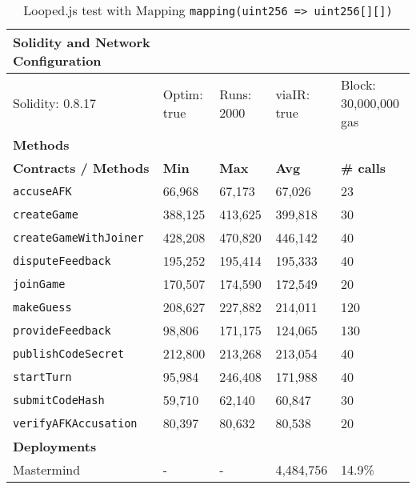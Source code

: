 \begin{table}[ht]
\centering
\begin{tabular}{|l|l|l|l|l|}
\hline
\textbf{Solidity and Network Configuration} & \multicolumn{4}{l|}{} \\ \hline
Solidity: 0.8.17 & Optim: true & Runs: 2000 & viaIR: true & Block: 30,000,000 gas \\ \hline
\textbf{Methods} & \multicolumn{4}{l|}{} \\ \hline
\textbf{Contracts / Methods} & \textbf{Min} & \textbf{Max} & \textbf{Avg} & \textbf{\# calls} \\ \hline

\texttt{accuseAFK} & 66,968 & 67,173 & 67,026 & 23 \\ \hline
\texttt{createGame} & 388,125 & 413,625 & 399,818 & 30 \\ \hline
\texttt{createGameWithJoiner} & 428,208 & 470,820 & 446,142 & 40 \\ \hline
\texttt{disputeFeedback} & 195,252 & 195,414 & 195,333 & 40 \\ \hline
\texttt{joinGame} & 170,507 & 174,590 & 172,549 & 20 \\ \hline
\texttt{makeGuess} & 208,627 & 227,882 & 214,011 & 120 \\ \hline
\texttt{provideFeedback} & 98,806 & 171,175 & 124,065 & 130 \\ \hline
\texttt{publishCodeSecret} & 212,800 & 213,268 & 213,054 & 40 \\ \hline
\texttt{startTurn} & 95,984 & 246,408 & 171,988 & 40 \\ \hline
\texttt{submitCodeHash} & 59,710 & 62,140 & 60,847 & 30 \\ \hline
\texttt{verifyAFKAccusation} & 80,397 & 80,632 & 80,538 & 20 \\ \hline
\textbf{Deployments} & \multicolumn{4}{l|}{} \\ \hline
Mastermind & - & - & 4,484,756 & 14.9\% \\ \hline
\end{tabular}
\caption{Looped.js test with Mapping \lstinline{mapping(uint256 => uint256[][])}}
\label{tab:looped-2-mapping}
\end{table}

